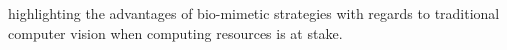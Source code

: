 highlighting the advantages of bio-mimetic strategies with regards to traditional computer vision when computing resources is at stake. 
%
%
%
